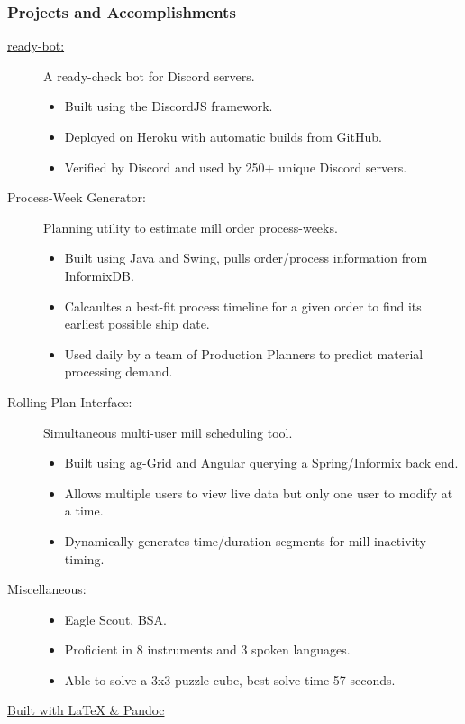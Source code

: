 \documentclass{article}
\begin{document}
\subsubsection*{Projects and Accomplishments}
    \begin{description}
        \item[\href{https://www.github.com/BurnsCommaLucas/ready-bot}{ready-bot:}] A ready-check bot for Discord servers.
            \begin{itemize}
                \item Built using the DiscordJS framework.
                \item Deployed on Heroku with automatic builds from GitHub.
                \item Verified by Discord and used by 250+ unique Discord servers.
            \end{itemize}

            \vspace{0.5em}

        \item[Process-Week Generator:] Planning utility to estimate mill order process-weeks.
            \begin{itemize}
                \item Built using Java and Swing, pulls order/process information from InformixDB.
                \item Calcaultes a best-fit process timeline for a given order to find its earliest possible ship date.
                \item Used daily by a team of Production Planners to predict material processing demand.
            \end{itemize}

            \vspace{0.5em}

        \item[Rolling Plan Interface:] Simultaneous multi-user mill scheduling tool.
            \begin{itemize}
                \item Built using ag-Grid and Angular querying a Spring/Informix back end.
                \item Allows multiple users to view live data but only one user to modify at a time.
                \item Dynamically generates time/duration segments for mill inactivity timing.
            \end{itemize}

            \vspace{0.5em}

        \item[Miscellaneous:] \hfill
            \begin{itemize}
                \item Eagle Scout, BSA.
                \item Proficient in 8 instruments and 3 spoken languages.
                \item Able to solve a 3x3 puzzle cube, best solve time 57 seconds.
        \end{itemize}
    \end{description}
    
    \begin{center}
	\vspace{.25in}
    \href{https://www.github.com/BurnsCommaLucas/Resume}{\tiny Built with \LaTeX \hspace{0.001in} \& Pandoc}
    \end{center}
\end{document}
